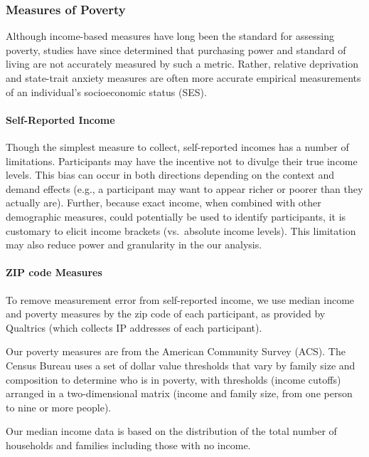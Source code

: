 \hypertarget{measures-of-poverty}{%
\subsubsection{Measures of Poverty}\label{measures-of-poverty}}

Although income-based measures have long been the standard for assessing
poverty, studies have since determined that purchasing power and
standard of living are not accurately measured by such a metric. Rather,
relative deprivation and state-trait anxiety measures are often more
accurate empirical measurements of an individual's socioeconomic status
(SES).

\hypertarget{self-reported-income}{%
\paragraph{Self-Reported Income}\label{self-reported-income}}

Though the simplest measure to collect, self-reported incomes has a
number of limitations. Participants may have the incentive not to
divulge their true income levels. This bias can occur in both directions
depending on the context and demand effects (e.g., a participant may
want to appear richer or poorer than they actually are). Further,
because exact income, when combined with other demographic measures,
could potentially be used to identify participants, it is customary to
elicit income brackets (vs.~absolute income levels). This limitation may
also reduce power and granularity in the our analysis.

\hypertarget{zip-code-measures}{%
\paragraph{ZIP code Measures}\label{zip-code-measures}}

To remove measurement error from self-reported income, we use median
income and poverty measures by the zip code of each participant, as
provided by Qualtrics (which collects IP addresses of each participant).

Our poverty measures are from the American Community Survey (ACS). The
Census Bureau uses a set of dollar value thresholds that vary by family
size and composition to determine who is in poverty, with thresholds
(income cutoffs) arranged in a two-dimensional matrix (income and family
size, from one person to nine or more people).

Our median income data is based on the distribution of the total number
of households and families including those with no income.

